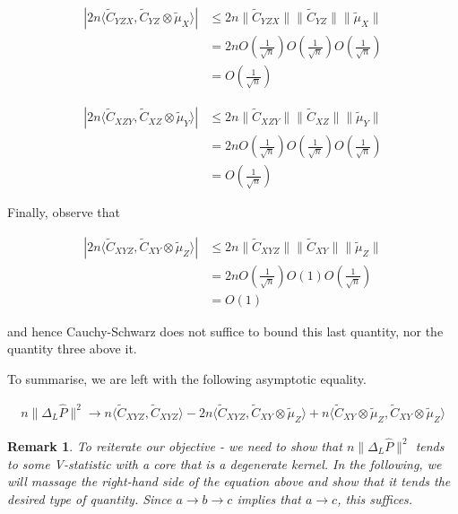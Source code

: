 \documentclass{article}
\newtheorem*{remark}{Remark}
\begin{document}
\begin{align*}
|2n\langle \tilde{C}_{YZX},\tilde{C}_{YZ}\otimes\tilde{\mu}_X \rangle| & \leq 2n\|\tilde{C}_{YZX}\|\|\tilde{C}_{YZ}\|\|\tilde{\mu}_X\| \\& = 2n O(\frac{1}{\sqrt{n}}) O(\frac{1}{\sqrt{n}}) O(\frac{1}{\sqrt{n}})  \\& =
O(\frac{1}{\sqrt{n}}) 
\end{align*}

\begin{align*}
|2n\langle \tilde{C}_{XZY},\tilde{C}_{XZ}\otimes\tilde{\mu}_Y \rangle| & \leq 2n\|\tilde{C}_{XZY}\|\|\tilde{C}_{XZ}\|\|\tilde{\mu}_Y\| \\& = 2n O(\frac{1}{\sqrt{n}}) O(\frac{1}{\sqrt{n}}) O(\frac{1}{\sqrt{n}})  \\& =
O(\frac{1}{\sqrt{n}}) 
\end{align*}

Finally, observe that

\begin{align*}
|2n\langle \tilde{C}_{XYZ},\tilde{C}_{XY}\otimes\tilde{\mu}_Z \rangle| & \leq 2n\|\tilde{C}_{XYZ}\|\|\tilde{C}_{XY}\|\|\tilde{\mu}_Z\| \\& = 2n O(\frac{1}{\sqrt{n}}) O(1) O(\frac{1}{\sqrt{n}})  \\& =
O(1) 
\end{align*}

and hence Cauchy-Schwarz does not suffice to bound this last quantity, nor the quantity three above it.

To summarise, we are left with the following asymptotic equality.

\begin{align*}
n\|\Delta_L \hat{P}\|^2 \longrightarrow n\langle \tilde{C}_{XYZ},\tilde{C}_{XYZ} \rangle - 2n\langle \tilde{C}_{XYZ},\tilde{C}_{XY}\otimes\tilde{\mu}_Z \rangle + n\langle \tilde{C}_{XY}\otimes\tilde{\mu}_Z,\tilde{C}_{XY}\otimes\tilde{\mu}_Z \rangle 
\end{align*}

\begin{remark}
To reiterate our objective - we need to show that $n\|\Delta_L \hat{P}\|^2$ tends to some V-statistic with a core that is a degenerate kernel. In the following, we will massage the right-hand side of the equation above and show that \emph{it} tends the desired type of quantity. Since $a \longrightarrow b \longrightarrow c$ implies that $a \longrightarrow c$, this suffices.
\end{remark}
\end{document}
